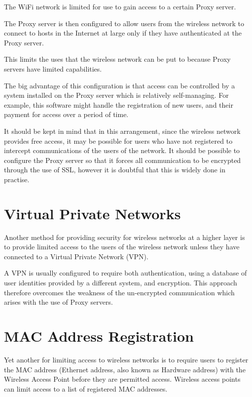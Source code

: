 The WiFi network is limited for use to gain access to a certain Proxy server.

The Proxy server is then configured to allow users from the wireless network to connect to hosts in the Internet at large only if they have authenticated at the Proxy server. 

This limits the uses that the wireless network can be put to because Proxy servers have limited capabilities.

The big advantage of this configuration is that access can be controlled by a system installed on the Proxy server which is relatively self-managing. For example, this software might handle the registration of new users, and their payment for access over a period of time.

It should be kept in mind that in this arrangement, since the wireless network provides free access, it may be possible for users who have not registered to intercept communications of the users of the network. It should be possible to configure the Proxy server so that it forces all communication to be encrypted through the use of SSL, however it is doubtful that this is widely done in practise.

\section{Virtual Private Networks}

Another method for providing security for wireless networks at a higher layer is to provide limited access to the users of the wireless network unless they have connected to a Virtual Private Network (VPN). 

A VPN is usually configured to require both authentication, using a database of user identities provided by a different system, and encryption. This approach therefore overcomes the weakness of the un-encrypted communication which arises with the
use of Proxy servers.

\section{MAC Address Registration}

Yet another for limiting access to wireless networks is to require users to register the MAC address (Ethernet address, also known as Hardware address) with the Wireless Access Point before they are permitted access. Wireless access points can limit access to a list of registered MAC addresses.

